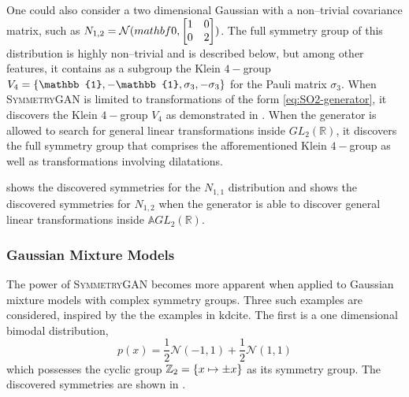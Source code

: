                 One could also consider a two dimensional Gaussian with a non--trivial covariance matrix, such as \(N_{1, 2} = \mathcal{N}(mathbf{0}, \mqty[1&0\\0&2])\).
                The full symmetry group of this distribution is highly non--trivial and is described below, but among other features, it contains as a subgroup the Klein \(4-\)group \(V_4 = \qty{\mathbb{1}, -\mathbb{1}, \sigma_3, -\sigma_3}\) for the Pauli matrix \(\sigma_3\).
                When \textsc{SymmetryGAN} is limited to transformations of the form \cref{eq:SO2-generator}, it discovers the Klein \(4-\)group \(V_4\) as demonstrated in .
                When the generator is allowed to search for general linear transformations inside \(GL_2(\mathbb{R})\), it discovers the full symmetry group that comprises the afforementioned Klein \(4-\)group as well as transformations involving dilatations.

                 shows the discovered symmetries for the \(N_{1, 1}\) distribution and  shows the discovered symmetries for \(N_{1, 2}\) when the generator is able to discover general linear transformations inside \(\mathbb{A}GL_2(\mathbb{R})\).
            \subsubsection{Gaussian Mixture Models}
                The power of \textsc{SymmetryGAN} becomes more apparent when applied to Gaussian mixture models with complex symmetry groups.
                Three such examples are considered, inspired by the the examples in kd{cite}.
                The first is a one dimensional bimodal distribution,
                \[
                    p(x) = \frac{1}{2} \mathcal{N}(-1, 1) + \frac{1}{2} \mathcal{N}(1, 1)
                \]
                which possesses the cyclic group \(\mathbb{Z}_2 = \qty{x \mapsto \pm x}\) as its symmetry group.
                The discovered symmetries are shown in .
                
